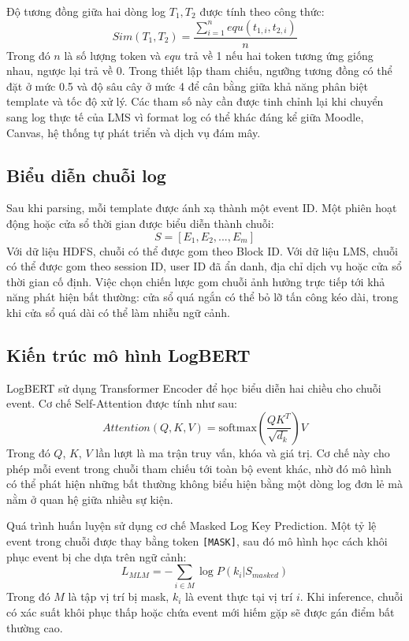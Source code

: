 \documentclass[conference]{IEEEtran}
\begin{document}
Độ tương đồng giữa hai dòng log $T_1, T_2$ được tính theo công thức:
\begin{equation}
Sim(T_1, T_2) = \frac{\sum_{i=1}^{n} equ(t_{1,i}, t_{2,i})}{n}
\label{eq_sim}
\end{equation}
Trong đó $n$ là số lượng token và $equ$ trả về 1 nếu hai token tương ứng giống nhau, ngược lại trả về 0. Trong thiết lập tham chiếu, ngưỡng tương đồng có thể đặt ở mức 0.5 và độ sâu cây ở mức 4 để cân bằng giữa khả năng phân biệt template và tốc độ xử lý. Các tham số này cần được tinh chỉnh lại khi chuyển sang log thực tế của LMS vì format log có thể khác đáng kể giữa Moodle, Canvas, hệ thống tự phát triển và dịch vụ đám mây.

\subsection{Biểu diễn chuỗi log}
Sau khi parsing, mỗi template được ánh xạ thành một event ID. Một phiên hoạt động hoặc cửa sổ thời gian được biểu diễn thành chuỗi:
\begin{equation}
S = [E_1, E_2, ..., E_m]
\end{equation}
Với dữ liệu HDFS, chuỗi có thể được gom theo Block ID. Với dữ liệu LMS, chuỗi có thể được gom theo session ID, user ID đã ẩn danh, địa chỉ dịch vụ hoặc cửa sổ thời gian cố định. Việc chọn chiến lược gom chuỗi ảnh hưởng trực tiếp tới khả năng phát hiện bất thường: cửa sổ quá ngắn có thể bỏ lỡ tấn công kéo dài, trong khi cửa sổ quá dài có thể làm nhiễu ngữ cảnh.

\subsection{Kiến trúc mô hình LogBERT}
LogBERT sử dụng Transformer Encoder để học biểu diễn hai chiều cho chuỗi event. Cơ chế Self-Attention được tính như sau:
\begin{equation}
Attention(Q,K,V) = \text{softmax}\left(\frac{QK^T}{\sqrt{d_k}}\right)V
\label{eq_att}
\end{equation}
Trong đó $Q$, $K$, $V$ lần lượt là ma trận truy vấn, khóa và giá trị. Cơ chế này cho phép mỗi event trong chuỗi tham chiếu tới toàn bộ event khác, nhờ đó mô hình có thể phát hiện những bất thường không biểu hiện bằng một dòng log đơn lẻ mà nằm ở quan hệ giữa nhiều sự kiện.

Quá trình huấn luyện sử dụng cơ chế Masked Log Key Prediction. Một tỷ lệ event trong chuỗi được thay bằng token \texttt{[MASK]}, sau đó mô hình học cách khôi phục event bị che dựa trên ngữ cảnh:
\begin{equation}
L_{MLM} = -\sum_{i \in M} \log P(k_i | S_{masked})
\label{eq_loss}
\end{equation}
Trong đó $M$ là tập vị trí bị mask, $k_i$ là event thực tại vị trí $i$. Khi inference, chuỗi có xác suất khôi phục thấp hoặc chứa event mới hiếm gặp sẽ được gán điểm bất thường cao.
\end{document}
